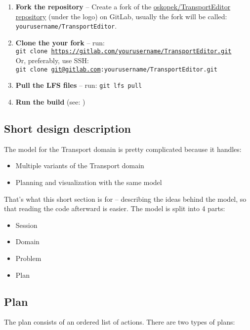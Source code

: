\begin{enumerate}
\begin{itemize}
\end{itemize}

\item \textbf{Fork the repository} -- Create a fork of the \href{https://gitlab.com/oskopek/TransportEditor/}{oskopek/TransportEditor repository}
(under the logo) on GitLab, usually the fork will be called: \texttt{yourusername/TransportEditor}.

\item \textbf{Clone the your fork} -- run:\\ \texttt{git clone \href{https://gitlab.com/yourusername/TransportEditor.git}{https://gitlab.com/yourusername/TransportEditor.git}}\\
Or, preferably, use SSH:\\ \texttt{git clone \href{mailto:git@gitlab.com}{git@gitlab.com}:yourusername/TransportEditor.git}

\item \textbf{Pull the LFS files} -- run: \texttt{git lfs pull}

\item \textbf{Run the build} (see: )
\end{enumerate}

\subsection*{Short design description}
The model for the Transport domain is pretty complicated
because it handles:

\begin{itemize}
\item Multiple variants of the Transport domain

\item Planning and visualization with the same model
\end{itemize}

That's what this short section is for -- describing the ideas behind the model, so that reading the code
afterward is easier. The model is split into 4 parts:

\begin{itemize}
\item Session
\item Domain
\item Problem
\item Plan
\end{itemize}

\subsection*{Plan}
The plan consists of an ordered list of actions.
There are two types of plans:

